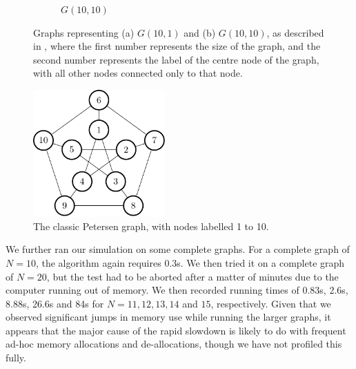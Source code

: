 \begin{figure}
\begin{subfigure}[b]{0.35\textwidth}
        \caption{\label{fig:gcol:g-10-10}\(G(10,10)\)}
    \end{subfigure}
    \caption[Graphs representing \(G(10,1)\) and \(G(10,10)\)]{\label{fig:gcol:gs}Graphs representing (a) \(G(10,1)\) and (b) \(G(10,10)\), as described in \cite{Gheorghe2013}, where the first number represents the size of the graph, and the second number represents the label of the centre node of the graph, with all other nodes connected only to that node.}
\end{figure}

\begin{figure}
    \centering
    \includegraphics[width=0.45\textwidth]{chapters/gcol/figs/petersen-figure0.pdf}
    \caption[The Petersen Graph]{\label{fig:gcol:petersen}The classic Petersen graph, with nodes labelled 1 to 10.}
\end{figure}

We further ran our simulation on some complete graphs.  For a complete graph of \(N = 10\), the algorithm again requires 0.3s.  We then tried it on a complete graph of \(N = 20\), but the test had to be aborted after a matter of minutes due to the computer running out of memory.  We then recorded running times of 0.83s, 2.6s, 8.88s, 26.6s and 84s for \(N = 11, 12, 13, 14\) and \(15\), respectively.  Given that we observed significant jumps in memory use while running the larger graphs, it appears that the major cause of the rapid slowdown is likely to do with frequent ad-hoc memory allocations and de-allocations, though we have not profiled this fully.


